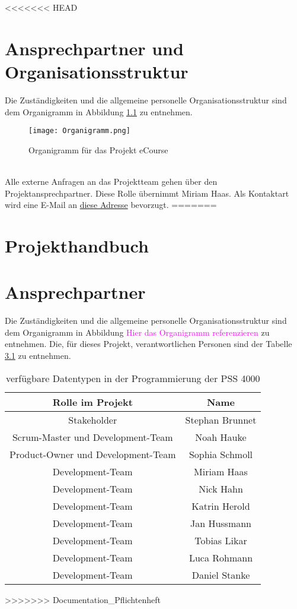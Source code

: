 
<<<<<<< HEAD
\chapter{Ansprechpartner und Organisationsstruktur}
Die Zuständigkeiten und die allgemeine personelle Organisationsstruktur sind dem Organigramm in Abbildung \ref{fib:Organigramm} zu entnehmen.
\begin{figure}[h]
\centering
\texttt{[image: Organigramm.png]}
\caption{Organigramm für das Projekt eCourse}
\label{fib:Organigramm}
\end{figure}\\

Alle externe Anfragen an das Projektteam gehen über den Projektansprechpartner. Diese Rolle übernimmt Miriam Haas. Als Kontaktart wird eine E-Mail an \href{mailto:inf19109@lehre.dhbw-stuttgart.de}{diese Adresse} bevorzugt. 
=======
\chapter{Projekthandbuch}

\chapter{Ansprechpartner}
Die Zuständigkeiten und die allgemeine personelle Organisationsstruktur sind dem Organigramm in Abbildung \textcolor{magenta}{Hier das Organigramm referenzieren} zu entnehmen.
Die, für dieses Projekt, verantwortlichen Personen sind der Tabelle \ref{tab:Ansprechpartner} zu entnehmen.

\begin{table} [H]
\centering
\begin{tabular} {|c|c|} 
\hline
Rolle im Projekt & Name \\
\hline
Stakeholder & Stephan Brunnet  \\
\hline
Scrum-Master und Development-Team & Noah Hauke \\
\hline
Product-Owner und Development-Team & Sophia Schmoll \\
\hline
Development-Team & Miriam Haas \\
\hline
Development-Team & Nick Hahn \\
\hline
Development-Team & Katrin Herold \\
\hline
Development-Team & Jan Hussmann \\
\hline
Development-Team & Tobias Likar \\
\hline
Development-Team & Luca Rohmann \\
\hline
Development-Team & Daniel Stanke \\
\hline
\end{tabular}
\caption{verfügbare Datentypen in der Programmierung der PSS 4000}
\label{tab:Ansprechpartner}
\end{table}
>>>>>>> Documentation_Pflichtenheft

